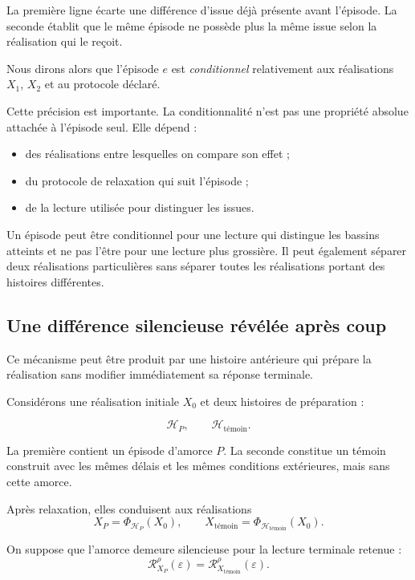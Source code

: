 La première ligne écarte une différence d'issue déjà présente avant l'épisode. La seconde établit que le même épisode ne possède plus la même issue selon la réalisation qui le reçoit.

Nous dirons alors que l'épisode $e$ est \emph{conditionnel} relativement aux réalisations $X_1$, $X_2$ et au protocole déclaré.

Cette précision est importante. La conditionnalité n'est pas une propriété absolue attachée à l'épisode seul. Elle dépend :

\begin{itemize}
\tightlist
\item
  des réalisations entre lesquelles on compare son effet ;
\item
  du protocole de relaxation qui suit l'épisode ;
\item
  de la lecture utilisée pour distinguer les issues.
\end{itemize}

Un épisode peut être conditionnel pour une lecture qui distingue les bassins atteints et ne pas l'être pour une lecture plus grossière. Il peut également séparer deux réalisations particulières sans séparer toutes les réalisations portant des histoires différentes.

\subsection{Une différence silencieuse révélée après coup}

Ce mécanisme peut être produit par une histoire antérieure qui prépare la réalisation sans modifier immédiatement sa réponse terminale.

Considérons une réalisation initiale $X_0$ et deux histoires de préparation :

\[
\mathcal H_P,
\qquad
\mathcal H_{\text{t\'emoin}}.
\]

La première contient un épisode d'amorce $P$. La seconde constitue un témoin construit avec les mêmes délais et les mêmes conditions extérieures, mais sans cette amorce.

Après relaxation, elles conduisent aux réalisations
\[
X_P
=
\Phi_{\mathcal H_P}(X_0),
\qquad
X_{\text{t\'emoin}}
=
\Phi_{\mathcal H_{\text{t\'emoin}}}(X_0).
\]

On suppose que l'amorce demeure silencieuse pour la lecture terminale retenue :
\[
\mathcal R_{X_P}^{\rho}(\varepsilon)
=
\mathcal R_{X_{\text{t\'emoin}}}^{\rho}(\varepsilon).
\]

